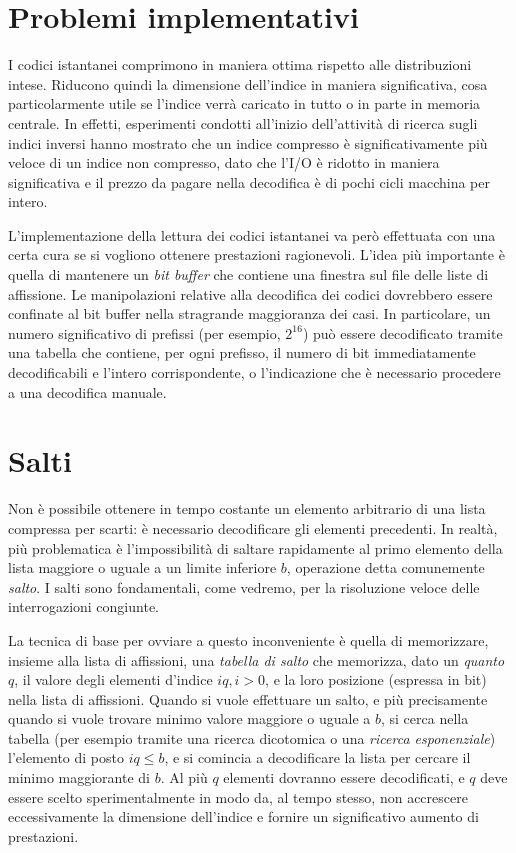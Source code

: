\section{Problemi implementativi}
I codici istantanei comprimono in maniera ottima rispetto alle distribuzioni intese. Riducono quindi la dimensione dell'indice in maniera significativa, cosa particolarmente utile se l'indice verrà caricato in tutto o in parte in memoria centrale. In effetti, esperimenti condotti all'inizio dell'attività di ricerca sugli indici inversi hanno mostrato che un indice compresso è significativamente più veloce di un indice non compresso, dato che l'I/O è ridotto in maniera significativa e il prezzo da pagare nella decodifica è di pochi cicli macchina per intero.

L'implementazione della lettura dei codici istantanei va però effettuata con una certa cura se si vogliono ottenere prestazioni ragionevoli. L'idea più importante è quella di mantenere un \textit{bit buffer} che contiene una finestra sul file delle liste di affissione. Le manipolazioni relative alla decodifica dei codici dovrebbero essere confinate al bit buffer nella stragrande maggioranza dei casi. In particolare, un numero significativo di prefissi (per esempio, $2^{16}$) può essere decodificato tramite una tabella che contiene, per ogni prefisso, il numero di bit immediatamente decodificabili e l'intero corrispondente, o l'indicazione che è necessario procedere a una decodifica manuale.
\section{Salti}
Non è possibile ottenere in tempo costante un elemento arbitrario di una lista compressa per scarti: è necessario decodificare gli elementi precedenti. In realtà, più problematica è l'impossibilità di saltare rapidamente al primo elemento della lista maggiore o uguale a un limite inferiore $b$, operazione detta comunemente \textit{salto}. I salti sono fondamentali, come vedremo, per la risoluzione veloce delle interrogazioni congiunte.

La tecnica di base per ovviare a questo inconveniente è quella di memorizzare, insieme alla lista di affissioni, una \textit{tabella di salto} che memorizza, dato un \textit{quanto} $q$, il valore degli elementi d'indice $iq, i > 0$, e la loro posizione (espressa in bit) nella lista di affissioni. Quando si vuole effettuare un salto, e più precisamente quando si vuole trovare minimo valore maggiore o uguale a $b$, si cerca nella tabella (per esempio tramite una ricerca dicotomica o una \textit{ricerca esponenziale}) l'elemento di posto $iq \leq b$, e si comincia a decodificare la lista per cercare il minimo maggiorante di $b$. Al più $q$ elementi dovranno essere decodificati, e $q$ deve essere scelto sperimentalmente in modo da, al tempo stesso, non accrescere eccessivamente la dimensione dell'indice e fornire un significativo aumento di prestazioni.

